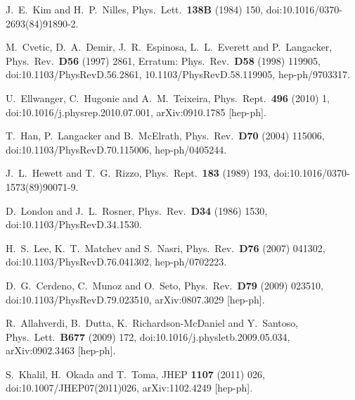 \documentclass[a4paper,11pt]{article}
\begin{document}
\begin{thebibliography}{99}
J.~E.~Kim and H.~P.~Nilles,
Phys.\ Lett.\  {\bf 138B} (1984) 150,
doi:10.1016/0370-2693(84)91890-2.

M.~Cvetic, D.~A.~Demir, J.~R.~Espinosa, L.~L.~Everett and P.~Langacker,
Phys.\ Rev.\ {\bf D56} (1997) 2861,  Erratum: Phys.\ Rev.\ {\bf D58} (1998) 
119905,
doi:10.1103/PhysRevD.56.2861, 10.1103/PhysRevD.58.119905,
hep-ph/9703317.

U.~Ellwanger, C.~Hugonie and A.~M.~Teixeira,
Phys.\ Rept.\  {\bf 496} (2010) 1, 
doi:10.1016/j.physrep.2010.07.001,
arXiv:0910.1785 [hep-ph].

  T.~Han, P.~Langacker and B.~McElrath,
  Phys.\ Rev.\ {\bf D70} (2004) 115006,
doi:10.1103/PhysRevD.70.115006,
hep-ph/0405244.

J.~L.~Hewett and T.~G.~Rizzo,
Phys.\ Rept.\  {\bf 183} (1989) 193,
doi:10.1016/0370-1573(89)90071-9.

D.~London and J.~L.~Rosner,
Phys.\ Rev.\ {\bf D34} (1986) 1530,
doi:10.1103/PhysRevD.34.1530.

  H.~S.~Lee, K.~T.~Matchev and S.~Nasri,
  Phys.\ Rev.\ {\bf D76} (2007) 041302,
  doi:10.1103/PhysRevD.76.041302,
  hep-ph/0702223.
 
  D.~G.~Cerdeno, C.~Munoz and O.~Seto,
  Phys.\ Rev.\ {\bf D79} (2009) 023510,
  doi:10.1103/PhysRevD.79.023510,
  arXiv:0807.3029 [hep-ph].

  R.~Allahverdi, B.~Dutta, K.~Richardson-McDaniel and Y.~Santoso,
  Phys.\ Lett.\ {\bf B677} (2009) 172,
  doi:10.1016/j.physletb.2009.05.034,
  arXiv:0902.3463 [hep-ph].

  S.~Khalil, H.~Okada and T.~Toma,
  JHEP {\bf 1107} (2011) 026,
  doi:10.1007/JHEP07(2011)026,
  arXiv:1102.4249 [hep-ph].


\end{thebibliography}
\end{document}
